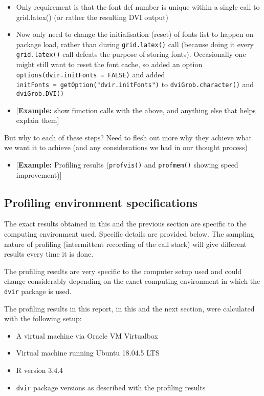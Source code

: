 \documentclass[]{article}
\providecommand{\tightlist}{%
  \setlength{\itemsep}{0pt}\setlength{\parskip}{0pt}}
\begin{document}
\begin{itemize}
\item
  Only requirement is that the font def number is unique within a single
  call to grid.latex() (or rather the resulting DVI output)
\item
  Now only need to change the initialisation (reset) of fonts list to
  happen on package load, rather than during \texttt{grid.latex()} call
  (because doing it every \texttt{grid.latex()} call defeats the purpose
  of storing fonts). Occasionally one might still want to reset the font
  cache, so added an option \texttt{options(dvir.initFonts\ =\ FALSE)}
  and added \texttt{initFonts\ =\ getOption("dvir.initFonts")} to
  \texttt{dviGrob.character()} and \texttt{dviGrob.DVI()}
\item
  {[}\textbf{Example:} show function calls with the above, and anything
  else that helps explain them{]}
\end{itemize}

But why to each of these steps? Need to flesh out more why they achieve
what we want it to achieve (and any considerations we had in our thought
process)

\begin{itemize}
\tightlist
\item
  {[}\textbf{Example:} Profiling results (\texttt{profvis()} and
  \texttt{profmem()} showing speed improvement){]}
\end{itemize}

\subsection{Profiling environment
specifications}\label{profiling-environment-specifications}

The exact results obtained in this and the previous section are specific
to the computing environment used. Specific details are provided below.
The sampling nature of profiling (intermittent recording of the call
stack) will give different results every time it is done.

The profiling results are very specific to the computer setup used and
could change considerably depending on the exact computing environment
in which the \texttt{dvir} package is used.

The profiling results in this report, in this and the next section, were
calculated with the following setup:

\begin{itemize}
\tightlist
\item
  A virtual machine via Oracle VM Virtualbox
\item
  Virtual machine running Ubuntu 18.04.5 LTS
\item
  R version 3.4.4
\item
  \texttt{dvir} package versions as described with the profiling results
\end{itemize}
\end{document}
